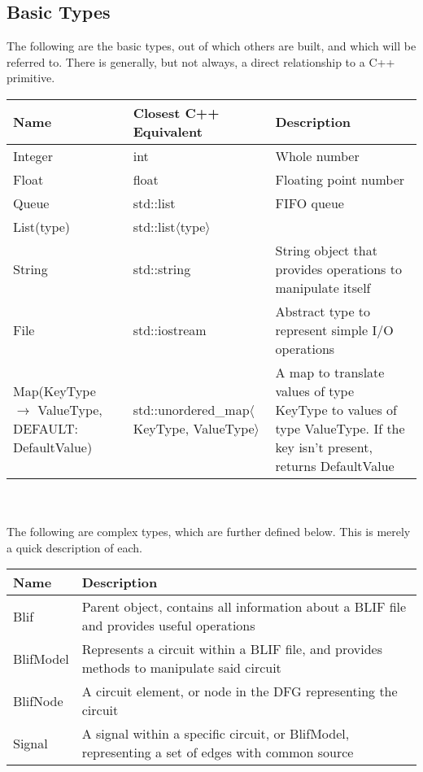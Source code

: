 \documentclass[12pt,final,oneside]{article} %
\begin{document}
\subsection{Basic Types}
The following are the basic types, out of which others are built, and which will be referred to. There is generally, but not always, a direct relationship to a C++ primitive.
\\
        \begin{tabularx}{\linewidth}{XXX}
        \toprule
        Name & Closest C++ Equivalent & Description\\
        \midrule
        Integer &  int & Whole number \\
        Float & float & Floating point number \\
        Queue & std::list & FIFO queue \\
        List(type) & std::list$\langle$type$\rangle$ &\\
        String & std::string & String object that provides operations to manipulate itself \\
        File & std::iostream & Abstract type to represent simple I/O operations \\
        Map(KeyType $\to$ ValueType, DEFAULT:  DefaultValue) & std::unordered\_map$\langle$KeyType, ValueType$\rangle$ & A map to translate values of type KeyType to values of type ValueType. If the key isn't present, returns DefaultValue \\
        \bottomrule
        \end{tabularx}
\\
\\
The following are complex types, which are further defined below. This is merely a quick description of each.
\\
        \begin{tabularx}{\linewidth}{lX}
        \toprule
        Name & Description\\
        \midrule
        Blif & Parent object, contains all information about a BLIF file and provides useful operations \\
        BlifModel & Represents a circuit within a BLIF file, and provides methods to manipulate said circuit \\
        BlifNode & A circuit element, or node in the DFG representing the circuit \\
        Signal & A signal within a specific circuit, or BlifModel, representing a set of edges with common source \\
        \bottomrule
        \end{tabularx}
\end{document}
